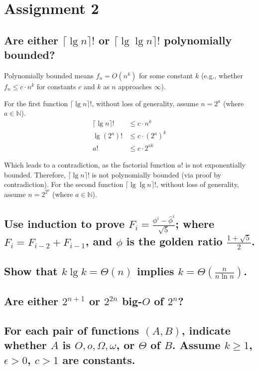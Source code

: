 \chapter{Assignment 2}


\section[Problem 1]{Are either $\lceil \lg n \rceil!$ or $\lceil \lg \lg n \rceil!$ polynomially bounded?}
Polynomially bounded means $f_n = O(n^k)$ for some constant $k$ (e.g., whether $f_n \leq c \cdot n^k$ for constants $c$ and $k$ as $n$ approaches $\infty$). 

For the first function $\lceil \lg n \rceil!$, without loss of generality, assume $n = 2^a$ (where $a \in \mathbb{N}$). 
\begin{align*}
	\lceil \lg n \rceil ! & \leq c \cdot n^k \\
	\lg (2^a) ! & \leq c \cdot (2^a)^k \\
	a! & \leq c \cdot 2^{ak}
\end{align*}

Which leads to a contradiction, as the factorial function $a!$ is not exponentially bounded. Therefore, $\lceil \lg n \rceil!$ is not polynomially bounded (via proof by contradiction). For the second function $\lceil \lg \lg n \rceil!$, without loss of generality, assume $n = 2^{2^a}$ (where $a \in \mathbb{N}$).

\section[Problem 2]{Use induction to prove $F_i = \frac{\phi^i - \hat{\phi}^i}{\sqrt{5}}$; where $F_i = F_{i-2} + F_{i-1}$, and $\phi$ is the golden ratio $\frac{1 + \sqrt{5}}{2}$.}

\section[Problem 3]{Show that $k \lg k = \Theta(n)$ implies $k = \Theta\left(\frac{n}{n \ln n}\right)$.}

\section[Problem 4]{Are either $2^{n + 1}$ or $2^{2n}$ big-$O$ of $2^n$?}

\section[Problem 5]{For each pair of functions $(A, B)$, indicate whether $A$ is $O, o, \Omega, \omega$, or $\Theta$ of $B$. Assume $k \geq 1$, $\epsilon > 0$, $c > 1$ are constants.}

